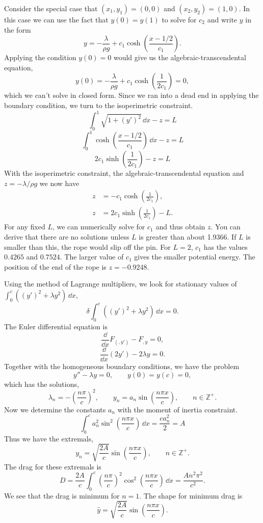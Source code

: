 \begin{Solution}
  Consider the special case that $(x_1,y_1) = (0,0)$ and $(x_2,y_2) = (1,0)$.
  In this case we can use the fact that $y(0) = y(1)$ to solve for $c_2$
  and write $y$ in the form
  \[
  y = - \frac{\lambda}{\rho g} + c_1 \cosh \left( \frac{x - 1/2}{c_1} \right).
  \]
  Applying the condition $y(0) = 0$ would give us the algebraic-transcendental
  equation,
  \[
  y(0) = - \frac{\lambda}{\rho g} + c_1 \cosh \left( \frac{1}{2 c_1} \right) = 0,
  \]
  which we can't solve in closed form.  
  Since we ran into a dead end in applying the boundary condition, we turn
  to the isoperimetric constraint.
  \[
  \int_0^1 \sqrt{1 + (y')^2}\,\dd x - z = L
  \]
  \[
  \int_0^1 \cosh\left( \frac{x-1/2}{c_1} \right)\,\dd x - z = L
  \]
  \[
  2 c_1 \sinh\left( \frac{1}{2 c_1} \right) - z = L
  \]
  With the isoperimetric constraint, the algebraic-transcendental equation and
  $z = - \lambda / \rho g$ we now have
  \begin{align*}
    z &= - c_1 \cosh \left( \frac{1}{2 c_1} \right), \\
    z &= 2 c_1 \sinh \left( \frac{1}{2 c_1} \right) - L.
  \end{align*}
  For any fixed $L$, we can numerically solve for $c_1$ and thus obtain $z$.
  You can derive that there are no solutions unless $L$ is greater than about
  1.9366.  If $L$ is smaller than this, the rope would slip off the pin.
  For $L = 2$, $c_1$ has the values $0.4265$ and $0.7524$.  The larger
  value of $c_1$ gives the smaller potential energy.  The position of
  the end of the rope is $z = -0.9248$.
\end{Solution}



\begin{Solution}
  Using the method of Lagrange multipliers, we look for stationary values of
  $\int_0^c ((y')^2 + \lambda y^2 )\,\dd x$,
  \[
  \delta \int_0^c ((y')^2 + \lambda y^2 )\,\dd x = 0.
  \]
  The Euler differential equation is
  \[
  \frac{\dd}{\dd x} F_(,y') - F_{,y} = 0,
  \]
  \[
  \frac{\dd}{\dd x} (2 y') - 2 \lambda y = 0.
  \]
  Together with the homogeneous boundary conditions, we have the problem
  \[
  y'' - \lambda y = 0, \qquad y(0) = y(c) = 0,
  \]
  which has the solutions,
  \[
  \lambda_n = - \left( \frac{n \pi}{c} \right)^2, \qquad
  y_n = a_n \sin\left( \frac{n \pi x}{c} \right), \qquad n \in \mathbb{Z}^+.
  \]
  Now we determine the constants $a_n$ with the moment of inertia constraint.
  \[
  \int_0^c a_n^2 \sin^2 \left( \frac{ n \pi x}{c} \right) \,\dd x
  = \frac{c a_n^2 }{2} = A
  \]
  Thus we have the extremals,
  \[
  y_n = \sqrt{ \frac{2 A}{c} } \sin \left( \frac{n \pi x}{c} \right), 
  \qquad n \in \mathbb{Z}^+.
  \]
  The drag for these extremals is
  \[
  D = \frac{2 A}{c} \int_0^c \left( \frac{n \pi}{c} \right)^2
  \cos^2 \left( \frac{n \pi x}{c} \right) \,\dd x
  = \frac{A n^2 \pi^2}{c^2}.
  \]
  We see that the drag is minimum for $n = 1$.  The shape for minimum 
  drag is
  \[
  \boxed{
    \hat{y} = \sqrt{ \frac{2 A}{c} } \sin \left( \frac{n \pi x}{c} \right).
    }
  \]
\end{Solution}



